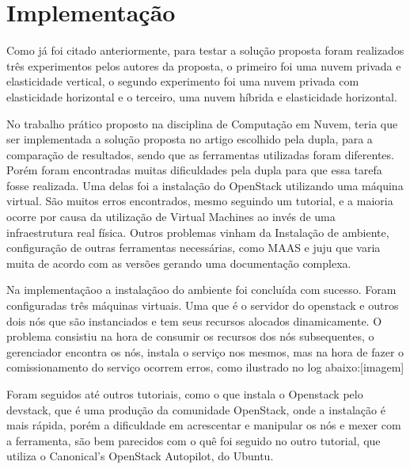 \chapter[Implementação]{Implementação}\label{cap1}

Como já foi citado anteriormente, para testar a solução proposta foram realizados três experimentos pelos autores da proposta, o primeiro foi uma nuvem privada e elasticidade vertical, o segundo experimento foi uma nuvem privada com elasticidade horizontal e o terceiro, uma nuvem híbrida e elasticidade horizontal.

No trabalho prático proposto na disciplina de Computação em Nuvem, teria que ser implementada a solução proposta no artigo escolhido pela dupla, para a comparação de resultados, sendo que as ferramentas utilizadas foram diferentes. Porém foram encontradas muitas dificuldades pela dupla para que essa tarefa fosse realizada. Uma delas foi a instalação do OpenStack utilizando uma máquina virtual.  São muitos erros encontrados, mesmo seguindo um tutorial, e a maioria ocorre por causa da utilização de  Virtual Machines ao invés de uma infraestrutura real física. Outros problemas vinham da Instalação de ambiente, configuração de outras ferramentas necessárias, como MAAS e juju que varia muita de acordo com as versões gerando uma documentação complexa.

Na implementaçãoo a instalaçãoo do ambiente foi concluída com sucesso. Foram configuradas três máquinas virtuais. Uma que é o servidor do openstack e outros dois nós que são instanciados e tem seus recursos alocados dinamicamente. O problema consistiu na hora de consumir os recursos dos nós subsequentes, o gerenciador encontra os nós, instala o serviço nos mesmos, mas na hora de fazer o comissionamento do serviço ocorrem erros, como ilustrado no log abaixo:[imagem]

Foram seguidos até outros tutoriais, como o que instala o Openstack pelo devstack, que é uma produção da comunidade OpenStack,  onde a instalação é mais rápida, porém a dificuldade em acrescentar e manipular os nós e mexer com a ferramenta, são bem parecidos com o quê foi seguido no outro tutorial, que utiliza o Canonical’s OpenStack Autopilot, do Ubuntu.
